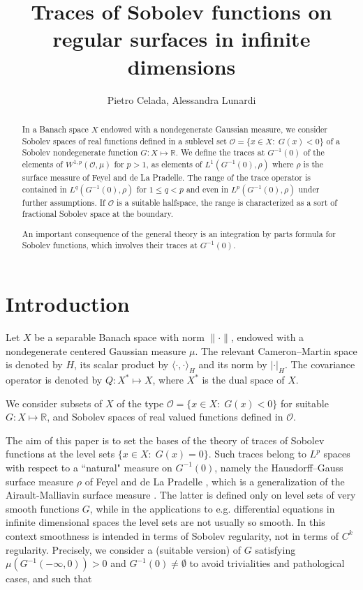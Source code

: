 \documentclass[reqno,twoside,12pt]{amsart}
\title[Traces]{Traces of Sobolev functions on regular surfaces in infinite dimensions}
\author[P. Celada, A. Lunardi]{Pietro Celada, Alessandra Lunardi}
\begin{document}
\begin{abstract}  
In a Banach space $X$ endowed with a nondegenerate Gaussian measure,  we consider Sobolev spaces of real functions defined in a sublevel set ${\mathcal O}= \{x\in X:\;G(x) <0\}$ of a Sobolev nondegenerate function $G:X\mapsto {\mathbb R}$. We define the traces at $G^{-1}(0)$ of the elements of $W^{1,p}({\mathcal O}, \mu)$ for $p>1$, as elements of  $L^1(G^{-1}(0), \rho)$ where $\rho$ is the surface measure of Feyel and de La Pradelle. The  range of the trace operator is contained in $L^q(G^{-1}(0), \rho)$ for $1\leq q<p$ and even in $L^p(G^{-1}(0), \rho)$ under further assumptions. 
If ${\mathcal O}$ is a suitable halfspace, the range is characterized as a sort of fractional Sobolev space at the boundary. 

An important consequence of the general theory is an integration by parts formula for Sobolev functions, which involves their traces at $G^{-1}(0)$.  
\end{abstract}
 

 
 \maketitle
 

\section{Introduction}
Let $X$ be a separable Banach space with norm $\|\cdot\|$,  endowed with a nondegenerate centered Gaussian measure $\mu$. The relevant Cameron--Martin space is denoted by $H$, its scalar product by $\langle \cdot , \cdot \rangle_H$ and its norm by $|\cdot |_H$. The covariance operator is denoted by $Q:X^*\mapsto X$, where $X^*$ is the dual space of $X$. 
 
We consider subsets of $X$ of the type ${\mathcal O} = \{x\in X: \;G(x) <0\}$ for suitable $G:X\mapsto {\mathbb R}$,  and Sobolev spaces of real valued functions defined in ${\mathcal O}$. 

The aim of this paper is to set the bases of the theory of traces  of  Sobolev functions at the level sets $\{x\in X:\;G(x) = 0\}$.  Such traces belong to $L^p$ spaces with respect to a ``natural"  measure on $G^{-1}(0)$, namely  the Hausdorff--Gauss surface measure $\rho$ of Feyel and de La Pradelle  \cite{FP}, which is a generalization of the Airault-Malliavin surface measure \cite{AM}. The latter is defined only on level sets of very smooth functions $G$, while in the applications to e.g. differential equations in infinite dimensional spaces the level sets are not usually so smooth. In this context smoothness is intended in terms of Sobolev regularity, not in terms of $C^k$ regularity. Precisely, we consider a (suitable version) of   $G$ satisfying $\mu(G^{-1}(-\infty, 0 )) >0$ and $G^{-1}(0)\neq \emptyset $ to avoid trivialities and pathological cases, and such that 
\end{document}
